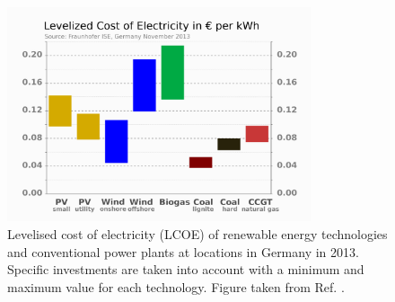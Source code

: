 \documentclass[11pt, twoside]{report}
\begin{document}
\begin{figure}[h!]
  \centering
    \includegraphics[width=0.8\textwidth]{figures/LCOE.png}
    \caption[Levelised cost of electricity (LCOE) of renewable energy technologies and conventional power plants at locations in Germany in 2013.  Specific investments are taken into account with a minimum and maximum value for each technology.]{Levelised cost of electricity (LCOE) of renewable energy technologies and conventional power plants at locations in Germany in 2013.  Specific investments are taken into account with a minimum and maximum value for each technology. Figure taken from Ref. .}
  \label{LCOE}
\end{figure}

\end{document}
